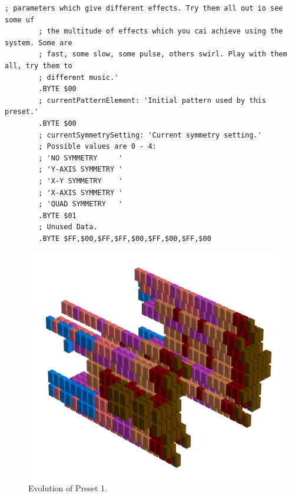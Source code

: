 \begin{lstlisting}[basicstyle=\ttfamily\tiny,caption=Source code for Preset 0.]
        ; parameters which give different effects. Try them all out io see some uf
        ; the multitude of effects which you cai achieve using the system. Some are
        ; fast, some slow, some pulse, others swirl. Play with them all, try them to
        ; different music.'
        .BYTE $00
        ; currentPatternElement: 'Initial pattern used by this preset.'
        .BYTE $00
        ; currentSymmetrySetting: 'Current symmetry setting.'
        ; Possible values are 0 - 4:
        ; 'NO SYMMETRY     '
        ; 'Y-AXIS SYMMETRY '
        ; 'X-Y SYMMETRY    '
        ; 'X-AXIS SYMMETRY '
        ; 'QUAD SYMMETRY   '
        .BYTE $01
        ; Unused Data.
        .BYTE $FF,$00,$FF,$FF,$00,$FF,$00,$FF,$00
\end{lstlisting}


\clearpage                                                                 
\begin{figure}[H]                                                          
    \centering                                                             
    \begin{adjustbox}{width=14cm,center}                                   
      \includegraphics[width=14cm]{src/presets/pattern1-45.png}%
    \end{adjustbox}                                                        
\caption{Evolution of Preset 1.}                                           
\end{figure}                                                               
\clearpage                                                                 
                                                                           
